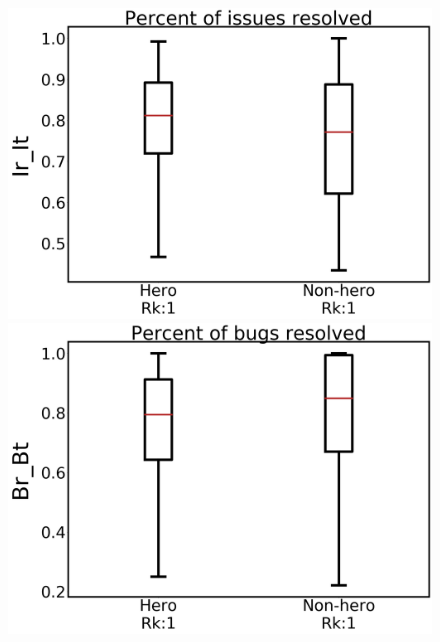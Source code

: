 \documentclass[sigconf]{acmart}
\theoremstyle{break}
\begin{document}
\begin{figure}[!t]
\begin{minipage}{.33\linewidth}
\centering
         \includegraphics[width=\linewidth,keepaspectratio]{./fig/Ir_It.png}
    \end{minipage}%
\begin{minipage}{.33\linewidth}
        \centering
        \includegraphics[width=\linewidth]{./fig/Br_Bt.png}
    \end{minipage}%
\begin{minipage}{.33\linewidth}
        \centering

\end{minipage}
\end{figure}
\end{document}
